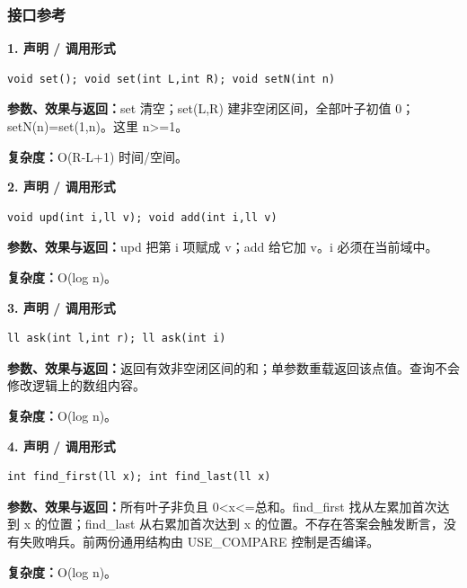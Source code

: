 \documentclass[UTF8,a4paper,10pt]{ctexart}
\begin{document}
\subsubsection*{接口参考}
\noindent\begin{minipage}{\textwidth}
\textbf{1. 声明 / 调用形式}
\begin{lstlisting}
void set(); void set(int L,int R); void setN(int n)
\end{lstlisting}
\textbf{参数、效果与返回：}set 清空；set(L,R) 建非空闭区间，全部叶子初值 0；setN(n)=set(1,n)。这里 n>=1。

\textbf{复杂度：}O(R-L+1) 时间/空间。

\end{minipage}\par\vspace{0.4em}
\noindent\begin{minipage}{\textwidth}
\textbf{2. 声明 / 调用形式}
\begin{lstlisting}
void upd(int i,ll v); void add(int i,ll v)
\end{lstlisting}
\textbf{参数、效果与返回：}upd 把第 i 项赋成 v；add 给它加 v。i 必须在当前域中。

\textbf{复杂度：}O(log n)。

\end{minipage}\par\vspace{0.4em}
\noindent\begin{minipage}{\textwidth}
\textbf{3. 声明 / 调用形式}
\begin{lstlisting}
ll ask(int l,int r); ll ask(int i)
\end{lstlisting}
\textbf{参数、效果与返回：}返回有效非空闭区间的和；单参数重载返回该点值。查询不会修改逻辑上的数组内容。

\textbf{复杂度：}O(log n)。

\end{minipage}\par\vspace{0.4em}
\noindent\begin{minipage}{\textwidth}
\textbf{4. 声明 / 调用形式}
\begin{lstlisting}
int find_first(ll x); int find_last(ll x)
\end{lstlisting}
\textbf{参数、效果与返回：}所有叶子非负且 0<x<=总和。find\_first 找从左累加首次达到 x 的位置；find\_last 从右累加首次达到 x 的位置。不存在答案会触发断言，没有失败哨兵。前两份通用结构由 USE\_COMPARE 控制是否编译。

\textbf{复杂度：}O(log n)。

\end{minipage}\par\vspace{0.4em}
\end{document}
